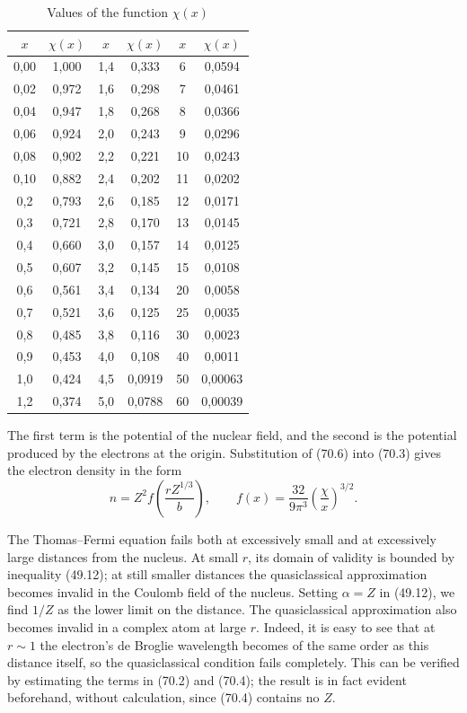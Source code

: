 \begin{table}[ht]
\centering
\caption{Values of the function $\chi(x)$}
\begin{tabular}{cc|cc|cc}
$x$&$\chi(x)$&$x$&$\chi(x)$&$x$&$\chi(x)$\\\hline
0,00&1,000&1,4&0,333&6&0,0594\\0,02&0,972&1,6&0,298&7&0,0461\\0,04&0,947&1,8&0,268&8&0,0366\\0,06&0,924&2,0&0,243&9&0,0296\\0,08&0,902&2,2&0,221&10&0,0243\\0,10&0,882&2,4&0,202&11&0,0202\\0,2&0,793&2,6&0,185&12&0,0171\\0,3&0,721&2,8&0,170&13&0,0145\\0,4&0,660&3,0&0,157&14&0,0125\\0,5&0,607&3,2&0,145&15&0,0108\\0,6&0,561&3,4&0,134&20&0,0058\\0,7&0,521&3,6&0,125&25&0,0035\\0,8&0,485&3,8&0,116&30&0,0023\\0,9&0,453&4,0&0,108&40&0,0011\\1,0&0,424&4,5&0,0919&50&0,00063\\1,2&0,374&5,0&0,0788&60&0,00039
\end{tabular}
\end{table}
The first term is the potential of the nuclear field, and the second is the potential produced by the electrons at the origin. Substitution of (70.6) into (70.3) gives the electron density in the form
\begin{equation}n=Z^2f\left(\frac{rZ^{1/3}}b\right),\qquad f(x)=\frac{32}{9\pi^3}\left(\frac\chi x\right)^{3/2}.\tag{70.9}\end{equation}




The Thomas--Fermi equation fails both at excessively small and at excessively large distances from the nucleus. At small $r$, its domain of validity is bounded by inequality (49.12); at still smaller distances the quasiclassical approximation becomes invalid in the Coulomb field of the nucleus. Setting $\alpha=Z$ in (49.12), we find $1/Z$ as the lower limit on the distance. The quasiclassical approximation also becomes invalid in a complex atom at large $r$. Indeed, it is easy to see that at $r\sim1$ the electron's de Broglie wavelength becomes of the same order as this distance itself, so the quasiclassical condition fails completely. This can be verified by estimating the terms in (70.2) and (70.4); the result is in fact evident beforehand, without calculation, since (70.4) contains no $Z$.

